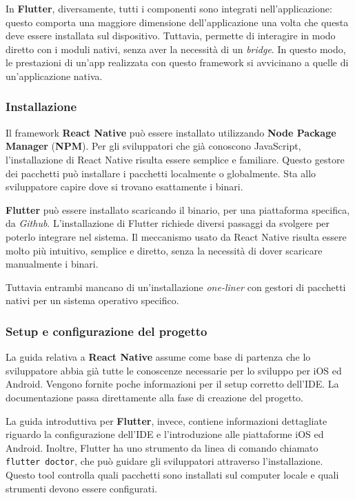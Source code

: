 In \textbf{Flutter}, diversamente, tutti i componenti sono integrati nell'applicazione: questo comporta una maggiore dimensione dell'applicazione una volta che questa deve essere installata sul dispositivo. Tuttavia, permette di interagire in modo diretto con i moduli nativi, senza aver la necessità di un \textit{bridge}. In questo modo, le prestazioni di un'app realizzata con questo framework si avvicinano a quelle di un'applicazione nativa.

\subsubsection{Installazione}
Il framework \textbf{React Native} può essere installato utilizzando \textbf{Node Package Manager} (\textbf{NPM}). Per gli sviluppatori che già conoscono JavaScript, l'installazione di React Native risulta essere semplice e familiare. Questo gestore dei pacchetti può installare i pacchetti localmente o globalmente. Sta allo sviluppatore capire dove si trovano esattamente i binari.

\textbf{Flutter} può essere installato scaricando il binario, per una piattaforma specifica, da \textit{Github}.  L'installazione di Flutter richiede diversi passaggi da svolgere per poterlo integrare nel sistema. Il meccanismo usato da React Native risulta essere molto più intuitivo, semplice e diretto, senza la necessità di dover scaricare manualmente i binari.

Tuttavia entrambi mancano di un'installazione \textit{one-liner} con gestori di pacchetti nativi per un sistema operativo specifico.

\subsubsection{Setup e configurazione del progetto}
La guida relativa a \textbf{React Native} assume come base di partenza che lo sviluppatore abbia già tutte le conoscenze necessarie per lo sviluppo per iOS ed Android. Vengono fornite poche informazioni per il setup corretto dell'IDE. La documentazione passa direttamente alla fase di creazione del progetto.

La guida introduttiva per \textbf{Flutter}, invece, contiene informazioni dettagliate riguardo la configurazione dell'IDE e l'introduzione alle piattaforme iOS ed Android. Inoltre, Flutter ha uno strumento da linea di comando chiamato \verb|flutter doctor|, che può guidare gli sviluppatori attraverso l'installazione. Questo tool controlla quali pacchetti sono installati sul computer locale e quali strumenti devono essere configurati.

